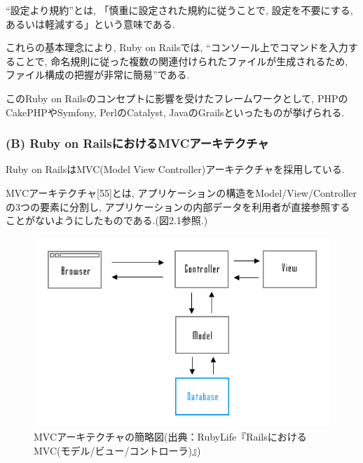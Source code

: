 “設定より規約”とは, 「慎重に設定された規約に従うことで, 設定を不要にする, あるいは軽減する」という意味である.

これらの基本理念により, Ruby on Railsでは, “コンソール上でコマンドを入力することで, 命名規則に従った複数の関連付けられたファイルが生成されるため, ファイル構成の把握が非常に簡易”である.

このRuby on Railsのコンセプトに影響を受けたフレームワークとして, PHPのCakePHPやSymfony, PerlのCatalyst, JavaのGrailsといったものが挙げられる.

\subsubsection{(B) Ruby on RailsにおけるMVCアーキテクチャ}
Ruby on RailsはMVC(Model View Controller)アーキテクチャを採用している.

MVCアーキテクチャ[55]とは, アプリケーションの構造をModel/View/Controllerの3つの要素に分割し, アプリケーションの内部データを利用者が直接参照することがないようにしたものである.(図2.1参照.)

\begin{figure}
\begin{center}
\includegraphics[width=15cm]{fig/mvc.png}
\caption{MVCアーキテクチャの簡略図(出典：RubyLife『RailsにおけるMVC(モデル/ビュー/コントローラ)』)}
\end{center}
\end{figure}

